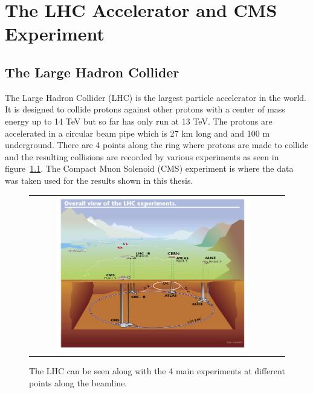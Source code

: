 \chapter{The LHC Accelerator and CMS Experiment}
\label {ch:cms}

\section{The Large Hadron Collider}
The Large Hadron Collider (LHC) is the largest particle accelerator in the world.
It is designed to collide protons against other protons with a center of mass energy up to 14 TeV but so far has only run at 13 TeV.
The protons are accelerated in a circular beam pipe which is 27 km long and and 100 m underground.
There are 4 points along the ring where protons are made to collide and the resulting collisions are recorded by various experiments as seen in figure~\ref{fig:lhcunderground}.
The Compact Muon Solenoid (CMS) experiment is where the data was taken used for the results shown in this thesis.

\begin{figure}[!ht]
\begin{center}
\begin{tabular}{cc}
\includegraphics[width=0.8\textwidth]{cms/figs/lhc-underground.jpeg}
\end{tabular}
\caption{ The LHC can be seen along with the 4 main experiments at different points along the beamline.
\label{fig:lhcunderground}
}
\end{center}
\end{figure}


